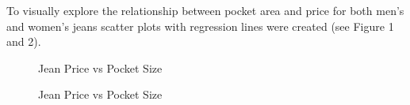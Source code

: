 \documentclass[
  letterpaper,
  DIV=11,
  numbers=noendperiod]{scrartcl}
\begin{document}
\newpage

To visually explore the relationship between pocket area and price for
both men's and women's jeans scatter plots with regression lines were
created (see Figure 1 and 2).

\begin{figure}

\begin{minipage}[t]{0.50\linewidth}

{\centering 


\caption{\label{fig-price_pocket-1}Jean Price vs Pocket Size}

}

\end{minipage}%
%
\begin{minipage}[t]{0.50\linewidth}

{\centering 


\caption{\label{fig-price_pocket-2}Jean Price vs Pocket Size}

}

\end{minipage}%

\end{figure}
\end{document}
